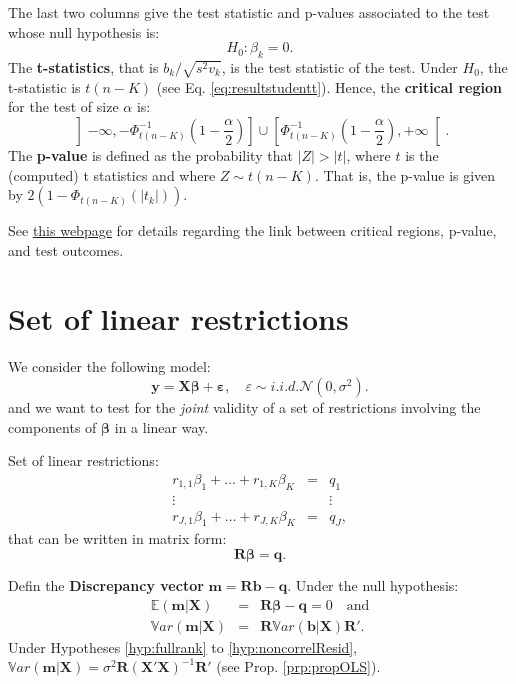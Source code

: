 \documentclass[
]{book}
\theoremstyle{definition}
\theoremstyle{definition}
\theoremstyle{definition}
\theoremstyle{definition}
\theoremstyle{remark}
\begin{document}
The last two columns give the test statistic and p-values associated to the test whose null hypothesis is:
\[
H_0: \beta_k=0.
\]
The \textbf{t-statistics}, that is \(b_k/\sqrt{s^2 v_k}\), is the test statistic of the test. Under \(H_0\), the t-statistic is \(t(n-K)\) (see Eq. \eqref{eq:resultstudentt}). Hence, the \textbf{critical region} for the test of size \(\alpha\) is:
\[
\left]-\infty,-\Phi^{-1}_{t(n-K)}\left(1-\frac{\alpha}{2}\right)\right] \cup \left[\Phi^{-1}_{t(n-K)}\left(1-\frac{\alpha}{2}\right),+\infty\right[.
\]
The \textbf{p-value} is defined as the probability that \(|Z| > |t|\), where \(t\) is the (computed) t statistics and where \(Z \sim t(n-K)\). That is, the p-value is given by \(2(1 - \Phi_{t(n-K)}(|t_k|))\).

See \href{https://jrenne.shinyapps.io/tests/}{this webpage} for details regarding the link between critical regions, p-value, and test outcomes.

\hypertarget{set-of-linear-restrictions}{%
\section{Set of linear restrictions}\label{set-of-linear-restrictions}}

We consider the following model:
\[
\mathbf{y} = \mathbf{X}\boldsymbol\beta + \boldsymbol\varepsilon, \quad \varepsilon \sim i.i.d. \mathcal{N}(0,\sigma^2).
\]
and we want to test for the \emph{joint} validity of a set of restrictions involving the components of \(\boldsymbol\beta\) in a linear way.

Set of linear restrictions:
\begin{equation}\label{eq:restrictions}
\begin{array}{ccc}
r_{1,1} \beta_1 + \dots + r_{1,K} \beta_K &=& q_1\\
\vdots && \vdots\\
r_{J,1} \beta_1 + \dots + r_{J,K} \beta_K &=& q_J,
\end{array}
\end{equation}
that can be written in matrix form:
\begin{equation}
\mathbf{R}\boldsymbol\beta = \mathbf{q}.
\end{equation}

Defin the \textbf{Discrepancy vector} \(\mathbf{m} = \mathbf{R}\mathbf{b} - \mathbf{q}\). Under the null hypothesis:
\begin{eqnarray*}
\mathbb{E}(\mathbf{m}|\mathbf{X}) &=& \mathbf{R}\boldsymbol\beta - \mathbf{q} = 0 \quad \mbox{and} \\
\mathbb{V}ar(\mathbf{m}|\mathbf{X}) &=& \mathbf{R} \mathbb{V}ar(\mathbf{b}|\mathbf{X}) \mathbf{R}'.
\end{eqnarray*}
Under Hypotheses \ref{hyp:fullrank} to \ref{hyp:noncorrelResid}, \(\mathbb{V}ar(\mathbf{m}|\mathbf{X}) = \sigma^2 \mathbf{R} (\mathbf{X}'\mathbf{X})^{-1} \mathbf{R}'\) (see Prop. \ref{prp:propOLS}).
\end{document}
